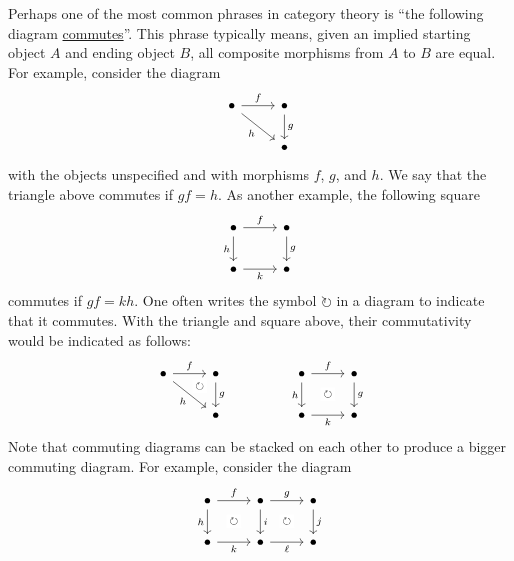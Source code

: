 \documentclass[a4paper,11pt]{article}
\theoremstyle{break_italics}
\theoremstyle{break_upright}
\theoremstyle{remark}
\begin{document}
Perhaps one of the most common phrases in category theory is ``the following diagram \uline{commutes}''. This phrase typically means, given an implied starting object $A$ and ending object $B$, all composite morphisms from $A$ to $B$ are equal. For example, consider the diagram
\[
\begin{tikzcd}
\bullet \arrow[r, "f"] \arrow[rd, "h"'] & \bullet \arrow[d, "g"] \\
                                        & \bullet               
\end{tikzcd}
\]
with the objects unspecified and with morphisms $f$, $g$, and $h$. We say that the triangle above commutes if $gf = h$. As another example, the following square
\[
\begin{tikzcd}
\bullet \arrow[r, "f"] \arrow[d, "h"'] & \bullet \arrow[d, "g"] \\
\bullet \arrow[r, "k"']                & \bullet               
\end{tikzcd}
\]
commutes if $gf = kh$. One often writes the symbol $\circlearrowright$ in a diagram to indicate that it commutes. With the triangle and square above, their commutativity would be indicated as follows:
\[\begin{tikzcd}
	\bullet & \bullet && \bullet & \bullet \\
	& \bullet && \bullet & \bullet
	\arrow["f", from=1-1, to=1-2]
	\arrow[""{name=0, anchor=center, inner sep=0}, "h"', from=1-1, to=2-2]
	\arrow["g", from=1-2, to=2-2]
	\arrow["f", from=1-4, to=1-5]
	\arrow["h"', from=1-4, to=2-4]
	\arrow["\circlearrowright"{description}, draw=none, from=1-4, to=2-5]
	\arrow["g", from=1-5, to=2-5]
	\arrow["k"', from=2-4, to=2-5]
	\arrow["\circlearrowright"{description, pos=0.4}, draw=none, from=1-2, to=0]
\end{tikzcd}\]
Note that commuting diagrams can be stacked on each other to produce a bigger commuting diagram. For example, consider the diagram
\[\begin{tikzcd}
	\bullet & \bullet & \bullet \\
	\bullet & \bullet & \bullet
	\arrow["f", from=1-1, to=1-2]
	\arrow["h"', from=1-1, to=2-1]
	\arrow["\circlearrowright"{description}, draw=none, from=1-1, to=2-2]
	\arrow["g", from=1-2, to=1-3]
	\arrow["i", from=1-2, to=2-2]
	\arrow["\circlearrowright"{description}, draw=none, from=1-2, to=2-3]
	\arrow["j", from=1-3, to=2-3]
	\arrow["k"', from=2-1, to=2-2]
	\arrow["\ell"', from=2-2, to=2-3]
\end{tikzcd}\]
\end{document}
